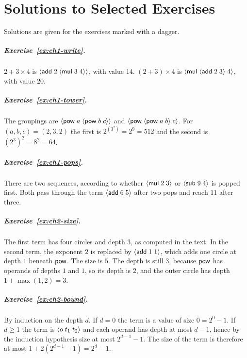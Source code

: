 \chapter{Solutions to Selected Exercises}
\label{app:solutions}

\noindent Solutions are given for the exercises marked with a dagger.

\paragraph{Exercise~\ref{ex:ch1-write}.}
$2+3\times4$ is $\langle \mathsf{add}\; 2\; \langle \mathsf{mul}\; 3\; 4\rangle\rangle$, with value $14$. $(2+3)\times4$ is $\langle \mathsf{mul}\; \langle \mathsf{add}\; 2\; 3\rangle\; 4\rangle$, with value $20$.

\paragraph{Exercise~\ref{ex:ch1-tower}.}
The groupings are $\langle \mathsf{pow}\; a\; \langle \mathsf{pow}\; b\; c\rangle\rangle$ and $\langle \mathsf{pow}\; \langle \mathsf{pow}\; a\; b\rangle\; c\rangle$. For $(a,b,c)=(2,3,2)$ the first is $2^{(3^2)}=2^9=512$ and the second is $(2^3)^2=8^2=64$.

\paragraph{Exercise~\ref{ex:ch1-pops}.}
There are two sequences, according to whether $\langle \mathsf{mul}\; 2\; 3\rangle$ or $\langle \mathsf{sub}\; 9\; 4\rangle$ is popped first. Both pass through the term $\langle \mathsf{add}\; 6\; 5\rangle$ after two pops and reach $11$ after three.

\paragraph{Exercise~\ref{ex:ch2-size}.}
The first term has four circles and depth $3$, as computed in the text. In the second term, the exponent $2$ is replaced by $\langle \mathsf{add}\; 1\; 1\rangle$, which adds one circle at depth $1$ beneath $\mathsf{pow}$. The size is $5$. The depth is still $3$, because $\mathsf{pow}$ has operands of depths $1$ and $1$, so its depth is $2$, and the outer circle has depth $1+\max(1,2)=3$.

\paragraph{Exercise~\ref{ex:ch2-bound}.}
By induction on the depth $d$. If $d=0$ the term is a value of size $0=2^{0}-1$. If $d\ge1$ the term is $\langle o\; t_1\; t_2\rangle$ and each operand has depth at most $d-1$, hence by the induction hypothesis size at most $2^{d-1}-1$. The size of the term is therefore at most $1+2(2^{d-1}-1)=2^{d}-1$.

